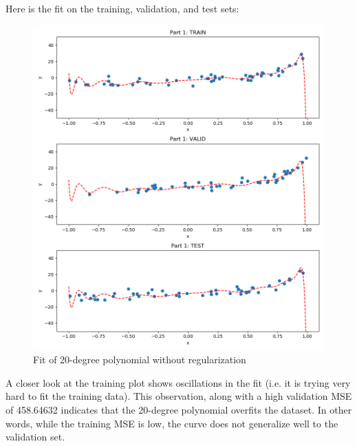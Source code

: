 \documentclass[paper=a4, fontsize=11pt]{scrartcl} %
\numberwithin{equation}{section} %
\numberwithin{figure}{section} %
\numberwithin{table}{section} %
\begin{document}
Here is the fit on the training, validation, and test sets:
\begin{figure}[H]
    \includegraphics[width=\linewidth]{q1p1.png}
    \caption{Fit of 20-degree polynomial without regularization}
    \label{fig:q1p1}
\end{figure}


A closer look at the training plot shows oscillations in the fit (i.e. it is trying very hard to fit the training data). This observation, along with a high validation MSE of 458.64632 indicates that the 20-degree polynomial overfits the dataset. In other words, while the training MSE is low, the curve does not generalize well to the validation set.
\end{document}
